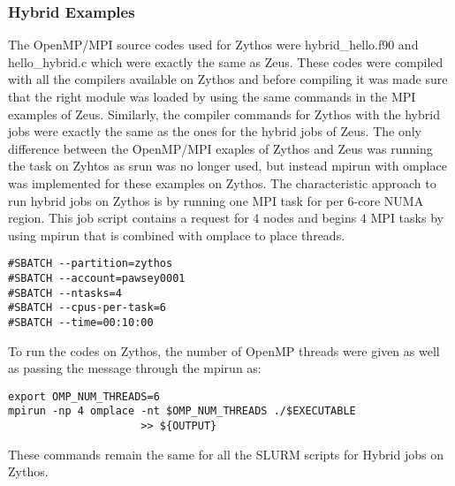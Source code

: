 \subsubsection{Hybrid Examples}

The OpenMP/MPI source codes used for Zythos were hybrid\_hello.f90 and hello\_hybrid.c which were exactly the same as Zeus. These codes were compiled with
all the compilers available on Zythos and before compiling it was made sure that the right module was loaded by using the same commands in the MPI 
examples of Zeus. Similarly, the compiler commands for Zythos with the hybrid jobs were exactly the same as the ones for the hybrid jobs of Zeus. The
only difference between the OpenMP/MPI exaples of Zythos and Zeus was running the task on Zyhtos as srun was no longer used, but instead mpirun with 
omplace was implemented for these examples on Zythos. The characteristic approach to run hybrid jobs on Zythos is by running one MPI task for per 6-core NUMA region. This job script contains a request for 4
nodes and begins 4 MPI tasks by using mpirun that is combined with omplace to place threads.

\begin{tcolorbox}
\begin{Verbatim}[fontsize=\scriptsize]
#SBATCH --partition=zythos
#SBATCH --account=pawsey0001
#SBATCH --ntasks=4
#SBATCH --cpus-per-task=6
#SBATCH --time=00:10:00
\end{Verbatim}
\end{tcolorbox}

To run the codes on Zythos, the number of OpenMP threads were given as well as passing the message through the mpirun as:

\begin{tcolorbox}
\begin{Verbatim}[fontsize=\scriptsize]
export OMP_NUM_THREADS=6
mpirun -np 4 omplace -nt $OMP_NUM_THREADS ./$EXECUTABLE
					 >> ${OUTPUT}
\end{Verbatim}
\end{tcolorbox}

These commands remain the same for all the SLURM scripts for Hybrid jobs on Zythos.



